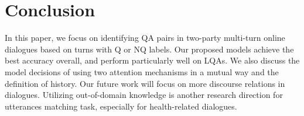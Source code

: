 \section{Conclusion}
\label{sec:conclusion}
In this paper, we focus on identifying QA pairs in two-party multi-turn online dialogues based on turns with Q or NQ labels. Our proposed models achieve the best accuracy overall, and perform particularly well on LQAs. We also discuss the model decisions of using two attention mechanisms in a mutual way and the definition of history. Our future work will focus on more discourse relations in dialogues. Utilizing out-of-domain knowledge is another research direction for utterances matching task, especially for health-related dialogues.



